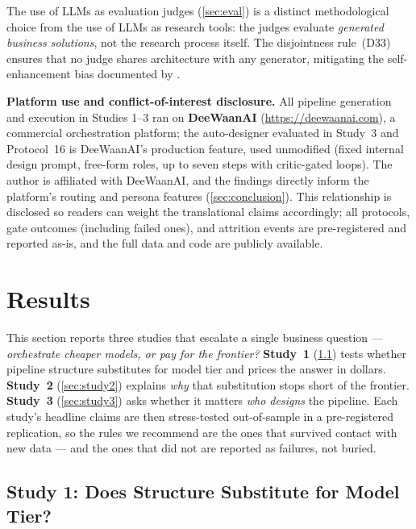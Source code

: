 \documentclass[12pt,a4paper]{article}
\begin{document}
The use of LLMs as evaluation judges (\cref{sec:eval}) is a distinct
methodological choice from the use of LLMs as research tools: the judges
evaluate \emph{generated business solutions}, not the research process itself.
The disjointness rule~(D33) ensures that no judge shares architecture with any
generator, mitigating the self-enhancement bias documented by
\citet{ZhengEtAl2023}.

\textbf{Platform use and conflict-of-interest disclosure.} All pipeline
generation and execution in Studies 1--3 ran on \textbf{DeeWaanAI}
(\url{https://deewaanai.com}), a commercial orchestration platform; the
auto-designer evaluated in Study~3 and Protocol~16 is DeeWaanAI's production
feature, used unmodified (fixed internal design prompt, free-form roles,
up to seven steps with critic-gated loops). The author is affiliated with
DeeWaanAI, and the findings directly inform the platform's routing and
persona features (\cref{sec:conclusion}). This relationship is disclosed so
readers can weight the translational claims accordingly; all protocols,
gate outcomes (including failed ones), and attrition events are
pre-registered and reported as-is, and the full data and code are publicly
available.

\section{Results}\label{sec:results}

This section reports three studies that escalate a single business question ---
\emph{orchestrate cheaper models, or pay for the frontier?} \textbf{Study~1}
(\cref{sec:study1}) tests whether pipeline structure substitutes for model tier
and prices the answer in dollars. \textbf{Study~2} (\cref{sec:study2}) explains
\emph{why} that substitution stops short of the frontier. \textbf{Study~3}
(\cref{sec:study3}) asks whether it matters \emph{who designs} the pipeline.
Each study's headline claims are then stress-tested out-of-sample in a
pre-registered replication, so the rules we recommend are the ones that survived
contact with new data --- and the ones that did not are reported as failures,
not buried.

\subsection{Study 1: Does Structure Substitute for Model Tier?}\label{sec:study1}
\end{document}
